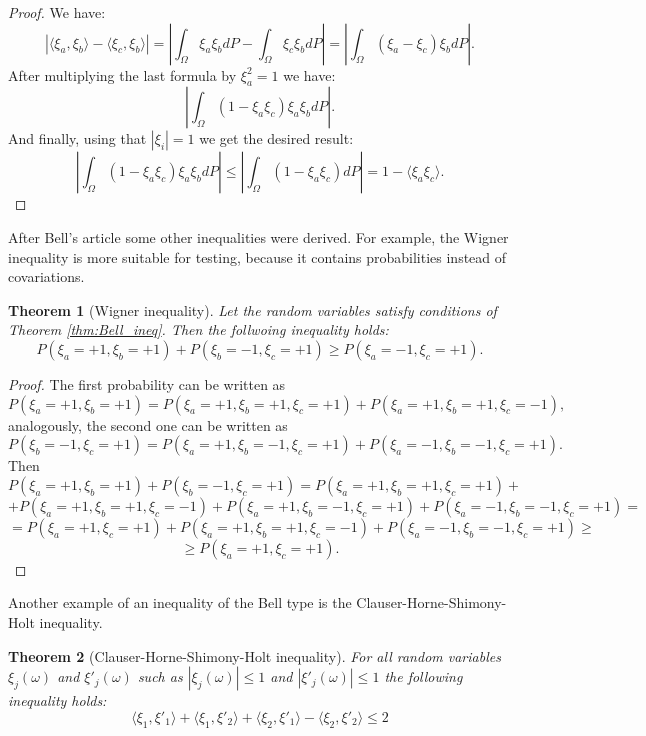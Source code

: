 \documentclass[%
master,         %
subf,           %
href,           %
colorlinks=true %
]{disser}
\numberwithin{equation}{section}
\numberwithin{figure}{section}
\newtheorem{theorem}{Theorem}[section]
\begin{document}
\begin{proof}
We have:
\[
| \langle\xi_a,\xi_b\rangle -  \langle\xi_c,\xi_b\rangle | = \left| \int_\Omega\xi_a\xi_b dP - \int_\Omega\xi_c\xi_b dP\right| = \left|\int_\Omega (\xi_a - \xi_c)\xi_bdP \right|.
\]
After multiplying the last formula by $\xi_a^2 = 1$ we have:
\[
\left|\int_\Omega (1 - \xi_a\xi_c)\xi_a\xi_bdP \right|.
\]
And finally, using that $|\xi_i| = 1$ we get the desired result:
\[
\left|\int_\Omega (1 - \xi_a\xi_c)\xi_a\xi_bdP \right| \leq  \left|\int_\Omega (1 - \xi_a\xi_c)dP\right| = 1 - \langle \xi_a\xi_c\rangle.
\]
\end{proof}

After Bell's article some other inequalities were derived. For example, the Wigner inequality is more suitable for testing, because it contains probabilities instead of covariations.
\begin{theorem}[Wigner inequality]
Let the random variables satisfy conditions of Theorem \ref{thm:Bell_ineq}. Then the follwoing inequality holds:
\[
P(\xi_a = +1, \xi_b = +1) + P(\xi_b = -1, \xi_c = +1) \geq P(\xi_a = -1, \xi_c = +1).
\]
\end{theorem}

\begin{proof}
The first probability can be written as 
\[
P(\xi_a = +1, \xi_b = +1) = P(\xi_a = +1, \xi_b = +1, \xi_c = +1) + P(\xi_a = +1, \xi_b = +1, \xi_c = -1),
\]
analogously, the second one can be written as
\[
P(\xi_b = -1, \xi_c = +1) = P(\xi_a = +1, \xi_b = -1, \xi_c = +1) + P(\xi_a = -1, \xi_b = -1, \xi_c = +1).
\]
Then
\[
P(\xi_a = +1, \xi_b = +1) + P(\xi_b = -1, \xi_c = +1) = P(\xi_a = +1, \xi_b = +1, \xi_c = +1) + 
\] 
\[
 + P(\xi_a = +1, \xi_b = +1, \xi_c = -1) + P(\xi_a = +1, \xi_b = -1, \xi_c = +1) + P(\xi_a = -1, \xi_b = -1, \xi_c = +1) = 
\]
\[
 =  P(\xi_a = +1, \xi_c = +1) + P(\xi_a = +1, \xi_b = +1, \xi_c = -1) + P(\xi_a = -1, \xi_b = -1, \xi_c = +1)\geq
\]
\[
 \geq P(\xi_a = +1, \xi_c = +1).
\]
\end{proof}

Another example of an inequality of the Bell type is the Clauser-Horne-Shimony-Holt inequality.
\begin{theorem}[Clauser-Horne-Shimony-Holt inequality]
For all random variables $\xi_j(\omega)$ and $\xi'_j(\omega)$ such as $|\xi_j(\omega)| \leq 1$ and $|\xi'_j(\omega)| \leq 1$ the following inequality holds:
\[
\langle\xi_1,\xi'_1\rangle + \langle\xi_1,\xi'_2\rangle + \langle\xi_2,\xi'_1\rangle -  \langle\xi_2,\xi'_2\rangle \leq 2
\]
\end{theorem}
\end{document}
